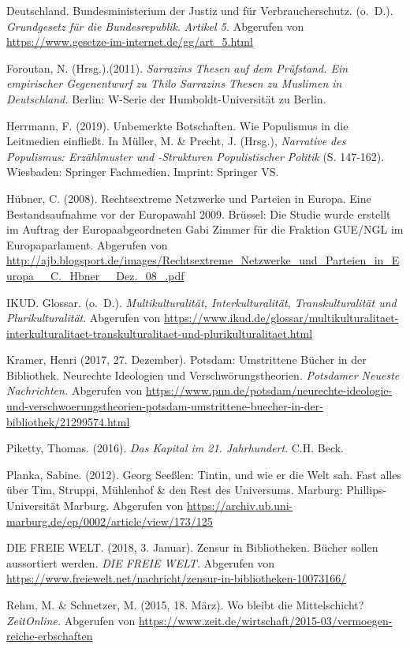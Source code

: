 \documentclass[a4paper,
fontsize=11pt,
oneside,
numbers=noperiodatend,
parskip=half-,
bibliography=totoc,
final
]{scrartcl}
\begin{document}
Deutschland. Bundesministerium der Justiz und für Verbraucherschutz.
(o.~D.). \emph{Grundgesetz für die Bundesrepublik}. \emph{Artikel 5.}
Abgerufen von \url{https://www.gesetze-im-internet.de/gg/art_5.html}

Foroutan, N. (Hrsg.).(2011). \emph{Sarrazins Thesen auf dem Prüfstand.
Ein empirischer Gegenentwurf zu Thilo Sarrazins Thesen zu Muslimen in
Deutschland.} Berlin: W-Serie der Humboldt-Universität zu Berlin.

Herrmann, F. (2019). Unbemerkte Botschaften. Wie Populismus in die
Leitmedien einfließt. In Müller, M. \& Precht, J. (Hrsg.),
\emph{Narrative des Populismus: Erzählmuster und -Strukturen
Populistischer Politik} (S. 147-162). Wiesbaden: Springer Fachmedien.
Imprint: Springer VS.

Hübner, C. (2008). Rechtsextreme Netzwerke und Parteien in Europa. Eine
Bestandsaufnahme vor der Europawahl 2009. Brüssel: Die Studie wurde
erstellt im Auftrag der Europaabgeordneten Gabi Zimmer für die Fraktion
GUE/NGL im Europaparlament. Abgerufen von
\url{http://ajb.blogsport.de/images/Rechtsextreme_Netzwerke_und_Parteien_in_Europa__C._Hbner__Dez._08_.pdf}

IKUD. Glossar. (o.~D.). \emph{Multikulturalität, Interkulturalität,
Transkulturalität und Plurikulturalität}. Abgerufen von
\url{https://www.ikud.de/glossar/multikulturalitaet-interkulturalitaet-transkulturalitaet-und-plurikulturalitaet.html}

Kramer, Henri (2017, 27. Dezember). Potsdam: Umstrittene Bücher in der
Bibliothek. Neurechte Ideologien und Verschwörungstheorien.
\emph{Potsdamer Neueste Nachrichten.} Abgerufen von
\url{https://www.pnn.de/potsdam/neurechte-ideologie-und-verschwoerungstheorien-potsdam-umstrittene-buecher-in-der-bibliothek/21299574.html}

Piketty, Thomas. (2016). \emph{Das Kapital im 21. Jahrhundert}. C.H.
Beck.

Planka, Sabine. (2012). Georg Seeßlen: Tintin, und wie er die Welt sah.
Fast alles über Tim, Struppi, Mühlenhof \& den Rest des Universums.
Marburg: Phillips-Universität Marburg. Abgerufen von
\url{https://archiv.ub.uni-marburg.de/ep/0002/article/view/173/125}

DIE FREIE WELT. (2018, 3. Januar). Zensur in Bibliotheken. Bücher sollen
aussortiert werden. \emph{DIE FREIE WELT.} Abgerufen von
\url{https://www.freiewelt.net/nachricht/zensur-in-bibliotheken-10073166/}

Rehm, M. \& Schnetzer, M. (2015, 18. März). Wo bleibt die Mittelschicht?
\emph{ZeitOnline.} Abgerufen von
\url{https://www.zeit.de/wirtschaft/2015-03/vermoegen-reiche-erbschaften}
\end{document}
